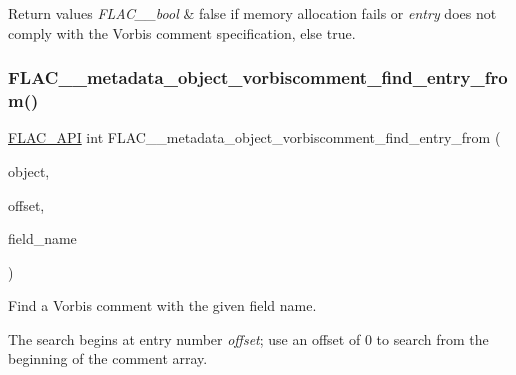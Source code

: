 \begin{DoxyRetVals}{Return values}
{\em F\+L\+A\+C\+\_\+\+\_\+bool} & {\ttfamily false} if memory allocation fails or {\itshape entry} does not comply with the Vorbis comment specification, else {\ttfamily true}. \\
\hline
\end{DoxyRetVals}
\mbox{\label{group__flac__metadata__object_gae094c1ce4f248d49e8c099661bd5288e}} 
\subsubsection{\texorpdfstring{F\+L\+A\+C\+\_\+\+\_\+metadata\+\_\+object\+\_\+vorbiscomment\+\_\+find\+\_\+entry\+\_\+from()}{FLAC\_\_metadata\_object\_vorbiscomment\_find\_entry\_from()}}
{\footnotesize\ttfamily \hyperlink{group__flac__export_ga56ca07df8a23310707732b1c0007d6f5}{F\+L\+A\+C\+\_\+\+A\+PI} int F\+L\+A\+C\+\_\+\+\_\+metadata\+\_\+object\+\_\+vorbiscomment\+\_\+find\+\_\+entry\+\_\+from (\begin{DoxyParamCaption}\item[{\hyperlink{zconf_8h_a2c212835823e3c54a8ab6d95c652660e}{const} \hyperlink{struct_f_l_a_c_____stream_metadata}{F\+L\+A\+C\+\_\+\+\_\+\+Stream\+Metadata} $\ast$}]{object,  }\item[{unsigned}]{offset,  }\item[{\hyperlink{zconf_8h_a2c212835823e3c54a8ab6d95c652660e}{const} char $\ast$}]{field\+\_\+name }\end{DoxyParamCaption})}

Find a Vorbis comment with the given field name.

The search begins at entry number {\itshape offset}; use an offset of 0 to search from the beginning of the comment array.


